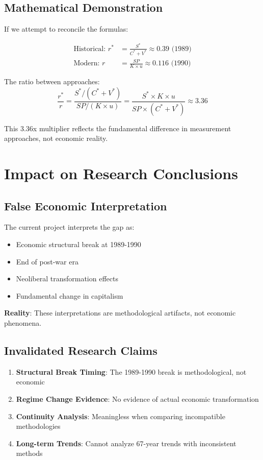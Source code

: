 \documentclass[12pt]{article}
\begin{document}
\subsection{Mathematical Demonstration}

If we attempt to reconcile the formulas:

\begin{align}
\text{Historical: } r^* &= \frac{S^*}{C^* + V^*} \approx 0.39 \text{ (1989)} \\
\text{Modern: } r &= \frac{SP}{K \times u} \approx 0.116 \text{ (1990)}
\end{align}

The ratio between approaches:
\begin{equation}
\frac{r^*}{r} = \frac{S^*/(C^* + V^*)}{SP/(K \times u)} = \frac{S^* \times K \times u}{SP \times (C^* + V^*)} \approx 3.36
\end{equation}

This 3.36x multiplier reflects the fundamental difference in measurement approaches, not economic reality.

\section{Impact on Research Conclusions}

\subsection{False Economic Interpretation}

The current project interprets the gap as:
\begin{itemize}
    \item Economic structural break at 1989-1990
    \item End of post-war era
    \item Neoliberal transformation effects
    \item Fundamental change in capitalism
\end{itemize}

\textbf{Reality}: These interpretations are methodological artifacts, not economic phenomena.

\subsection{Invalidated Research Claims}

\begin{enumerate}
    \item \textbf{Structural Break Timing}: The 1989-1990 break is methodological, not economic
    \item \textbf{Regime Change Evidence}: No evidence of actual economic transformation
    \item \textbf{Continuity Analysis}: Meaningless when comparing incompatible methodologies
    \item \textbf{Long-term Trends}: Cannot analyze 67-year trends with inconsistent methods
\end{enumerate}
\end{document}
